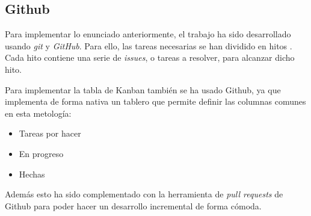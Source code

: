 \subsection{Github}

Para implementar lo enunciado anteriormente, el trabajo ha sido desarrollado usando \textit{git} y \textit{GitHub}.
Para ello, las tareas necesarias se han dividido en hitos \cite{milestones}. Cada hito contiene una
serie de \textit{issues}, o tareas a resolver, para alcanzar dicho hito.

Para implementar la tabla de Kanban también se ha usado Github, ya que implementa de forma nativa un
tablero que permite definir las columnas comunes en esta metología:

\begin{itemize}
    \item Tareas por hacer
    \item En progreso
    \item Hechas
\end{itemize}

Además esto ha sido complementado con la herramienta de \textit{pull requests} de Github para poder hacer
un desarrollo incremental de forma cómoda.
